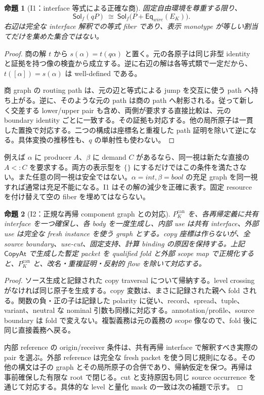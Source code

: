 \documentclass[11pt,a4paper]{article}
\newtheorem{theorem}{命題}[section]
\theoremstyle{remark}
\newcommand{\Sol}{\mathsf{Sol}}
\begin{document}
\begin{theorem}[I1：interface 等式による正確な商]
固定自由環境を尊重する限り、
\[
 \Sol_f(qP)\ \cong\
 \Sol_f\bigl(P+\mathsf{Eq}_{wire}(E_K)\bigr).
\]
右辺は完全な interface 解釈での等式 fiber であり、表示 monotype が等しい割当てだけを集めた集合ではない。
\end{theorem}
\begin{proof}
商の解 $t$ から $s(\alpha)=t(q\alpha)$ と置く。元の各原子は同じ非型 identity と証拠を持つ像の検査から成立する。逆に右辺の解は各等式類で一定だから、$t([\alpha])=s(\alpha)$ は well-defined である。

商 graph の routing path は、元の辺と等式による jump を交互に使う path へ持ち上がる。逆に、そのような元の path は商の path へ射影される。従って新しく交差する lower/upper pair も含め、両側が要求する直接比較は、元の boundary identity ごとに一致する。その証拠も対応する。他の局所原子は一貫した置換で対応する。二つの構成は座標名と重複した path 証明を除いて逆になる。具体変換の推移性も、$q$ の単射性も使わない。
\end{proof}

例えば $\alpha$ に producer $A$、$\beta$ に demand $C$ があるなら、同一視は新たな直接の $A<:C$ を要求する。両方の表示型を $\{\}$ にするだけではこの条件を満たさない。また任意の同一視は安全ではない。$\alpha=int,\beta=bool$ の充足 graph を同一視すれば通常は充足不能になる。I1 はその解の減少を正確に表す。固定 resource を付け替えて空の fiber を埋めてはならない。

\begin{theorem}[I2：正規な再帰 component graph との対応]
$P_K^{\mathrm{can}}$ を、各再帰定義に共有 interface を一つ確保し、各 body を一度生成し、内部 use は共有 interface、外部 use は完全な fresh instance を使う graph とする。copy 座標は作らないが、全 source boundary、use-cut、固定支持、計算 binding の原因を保持する。上記 $\mathsf{CopyAt}$ で生成した暫定 packet を qualified fold と外部 scope map で正規化すると、$P_K^{\mathrm{can}}$ と、改名・重複証明・反射的 flow を除いて対応する。
\end{theorem}
\begin{proof}
ソース生成と記録された copy traversal について帰納する。level crossing がなければ同じ原子を生成する。copy 変数は、まさに記録された親へ fold される。関数の負・正の子は記録した polarity に従い、record、spread、tuple、variant、neutral な nominal 引数も同様に対応する。annotation/profile、source boundary は fold で変えない。複製義務は元の義務の scope 像なので、fold 後に同じ直接義務へ戻る。

内部 reference の origin/receiver 条件は、共有再帰 interface で解釈すべき実際の pair を選ぶ。外部 reference は完全な fresh packet を使う同じ規則になる。その他の構文は子の graph とその局所原子の合併であり、帰納仮定を保つ。再帰は事前確保した有限な root で閉じる。cut と支持原因も同じ source occurrence を通じて対応する。具体的な level と量化 mask の一致は次の補題で示す。
\end{proof}
\end{document}
